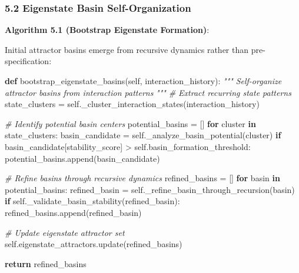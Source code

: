 \documentclass[
]{article}
\newenvironment{Shaded}{}{}
\newcommand{\CommentTok}[1]{\textcolor[rgb]{0.38,0.63,0.69}{\textit{#1}}}
\newcommand{\ControlFlowTok}[1]{\textcolor[rgb]{0.00,0.44,0.13}{\textbf{#1}}}
\newcommand{\KeywordTok}[1]{\textcolor[rgb]{0.00,0.44,0.13}{\textbf{#1}}}
\newcommand{\NormalTok}[1]{#1}
\newcommand{\OperatorTok}[1]{\textcolor[rgb]{0.40,0.40,0.40}{#1}}
\newcommand{\StringTok}[1]{\textcolor[rgb]{0.25,0.44,0.63}{#1}}
\newcommand{\VariableTok}[1]{\textcolor[rgb]{0.10,0.09,0.49}{#1}}
\begin{document}
\subsubsection{5.2 Eigenstate Basin
Self-Organization}\label{eigenstate-basin-self-organization}

\textbf{Algorithm 5.1 (Bootstrap Eigenstate Formation)}:

Initial attractor basins emerge from recursive dynamics rather than
pre-specification:

\begin{Shaded}
\begin{Highlighting}[]
\KeywordTok{def}\NormalTok{ bootstrap\_eigenstate\_basins(}\VariableTok{self}\NormalTok{, interaction\_history):}
    \CommentTok{"""}
\CommentTok{    Self{-}organize attractor basins from interaction patterns}
\CommentTok{    """}
    \CommentTok{\# Extract recurring state patterns}
\NormalTok{    state\_clusters }\OperatorTok{=} \VariableTok{self}\NormalTok{.\_cluster\_interaction\_states(interaction\_history)}

    \CommentTok{\# Identify potential basin centers}
\NormalTok{    potential\_basins }\OperatorTok{=}\NormalTok{ []}
    \ControlFlowTok{for}\NormalTok{ cluster }\KeywordTok{in}\NormalTok{ state\_clusters:}
\NormalTok{        basin\_candidate }\OperatorTok{=} \VariableTok{self}\NormalTok{.\_analyze\_basin\_potential(cluster)}
        \ControlFlowTok{if}\NormalTok{ basin\_candidate[}\StringTok{\textquotesingle{}stability\_score\textquotesingle{}}\NormalTok{] }\OperatorTok{\textgreater{}} \VariableTok{self}\NormalTok{.basin\_formation\_threshold:}
\NormalTok{            potential\_basins.append(basin\_candidate)}

    \CommentTok{\# Refine basins through recursive dynamics}
\NormalTok{    refined\_basins }\OperatorTok{=}\NormalTok{ []}
    \ControlFlowTok{for}\NormalTok{ basin }\KeywordTok{in}\NormalTok{ potential\_basins:}
\NormalTok{        refined\_basin }\OperatorTok{=} \VariableTok{self}\NormalTok{.\_refine\_basin\_through\_recursion(basin)}
        \ControlFlowTok{if} \VariableTok{self}\NormalTok{.\_validate\_basin\_stability(refined\_basin):}
\NormalTok{            refined\_basins.append(refined\_basin)}

    \CommentTok{\# Update eigenstate attractor set}
    \VariableTok{self}\NormalTok{.eigenstate\_attractors.update(refined\_basins)}

    \ControlFlowTok{return}\NormalTok{ refined\_basins}
\end{Highlighting}
\end{Shaded}
\end{document}
